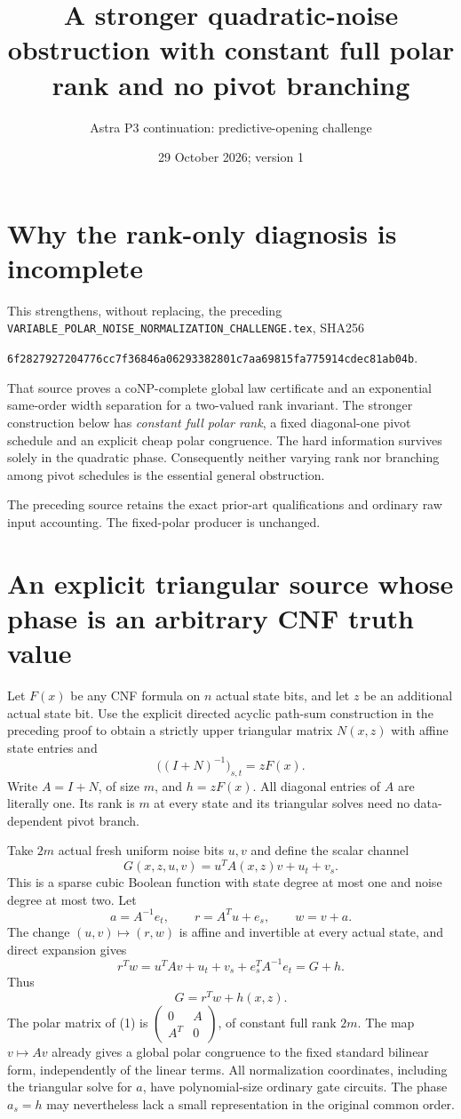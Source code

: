 \documentclass[11pt]{article}
\title{A stronger quadratic-noise obstruction with constant full polar rank and no pivot branching}
\author{Astra P3 continuation: predictive-opening challenge}
\date{29 October 2026; version 1}
\begin{document}
\maketitle

\section{Why the rank-only diagnosis is incomplete}

This strengthens, without replacing, the preceding
\texttt{VARIABLE\_POLAR\_NOISE\_NORMALIZATION\_CHALLENGE.tex}, SHA256
\begin{center}\scriptsize\texttt{6f2827927204776cc7f36846a06293382801c7aa69815fa775914cdec81ab04b}.\end{center}
That source proves a coNP-complete global law certificate and an exponential
same-order width separation for a two-valued rank invariant.  The stronger
construction below has \emph{constant full polar rank}, a fixed diagonal-one
pivot schedule and an explicit cheap polar congruence.  The hard information
survives solely in the quadratic phase.  Consequently neither varying rank nor
branching among pivot schedules is the essential general obstruction.

The preceding source retains the exact prior-art qualifications and ordinary
raw input accounting.  The fixed-polar producer is unchanged.

\section{An explicit triangular source whose phase is an arbitrary CNF truth value}

Let $F(x)$ be any CNF formula on $n$ actual state bits, and let $z$ be an
additional actual state bit.  Use the explicit directed acyclic path-sum
construction in the preceding proof to obtain a strictly upper triangular
matrix $N(x,z)$ with affine state entries and
\[
 \big((I+N)^{-1}\big)_{s,t}=zF(x).
\]
Write $A=I+N$, of size $m$, and $h=zF(x)$.  All diagonal entries of $A$ are
literally one.  Its rank is $m$ at every state and its triangular solves need
no data-dependent pivot branch.

Take $2m$ actual fresh uniform noise bits $u,v$ and define the scalar channel
\[
 G(x,z,u,v)=u^TA(x,z)v+u_t+v_s.\tag{1}
\]
This is a sparse cubic Boolean function with state degree at most one and noise
degree at most two.  Let
\[
 a=A^{-1}e_t,\qquad r=A^Tu+e_s,\qquad w=v+a.
\]
The change $(u,v)\mapsto(r,w)$ is affine and invertible at every actual state,
and direct expansion gives
\[
 r^Tw=u^TAv+u_t+v_s+e_s^TA^{-1}e_t=G+h.
\]
Thus
\[
 \boxed{\qquad G=r^Tw+h(x,z).\qquad}\tag{2}
\]
The polar matrix of (1) is
$\left(\begin{smallmatrix}0&A\\A^T&0\end{smallmatrix}\right)$,
of constant full rank $2m$.  The map $v\mapsto Av$ already gives a global
polar congruence to the fixed standard bilinear form, independently of the
linear terms.  All normalization coordinates, including the triangular solve
for $a$, have polynomial-size ordinary gate circuits.  The phase $a_s=h$ may
nevertheless lack a small representation in the original common order.
\end{document}
